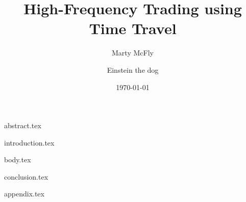 \documentclass[]{vegaarticle}
\title{High-Frequency Trading using Time Travel}
\author[1]{Marty McFly \email{marty\_mcfly@delorean.edu}}
\affil[1]{University of Time Travel}
\author[2]{Einstein the dog}
\affil[2]{University of Great Scott}
\date{\today}
\begin{document}
    \maketitle	                  %

    {abstract.tex}     %
    
    {introduction.tex} %
    
    {body.tex}         %

    {conclusion.tex}   %

    
    {appendix.tex}     %
\end{document}
